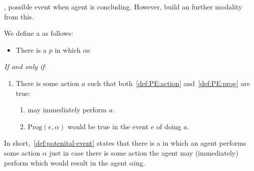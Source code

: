 \begin{note}
  \assuPP{}, possible event when agent is concluding.
  However, build an further modality from this.

  We define a \pevent{} as follows:
  \begin{definition}[\pevent{3}]
    \label{def:potenital-event}

    \begin{itemize}
    \item
      There is a \pevent{} \(p\) in which \vAgent{} \(\alpha\)s
    \end{itemize}

    \emph{If and only if}:

    \begin{enumerate}[label=]
    \item
      There is some action \(a\) such that both~\ref{def:PE:action} and~\ref{def:PE:prog} are true:
      \begin{enumerate}[label=\alph*., ref=(\alph*)]
      \item
        \label{def:PE:action}
        \vAgent{} may immediately perform \(a\).
      \item
        \label{def:PE:prog}
        \(\text{Prog}(e, \alpha)\) would be true in the event \(e\) of \vAgent{} doing \(a\).
      \end{enumerate}
    \end{enumerate}
    \vspace{-\baselineskip}
  \end{definition}

  In short,~\autoref{def:potenital-event} states that there is a \pevent{} in which an agent performs some action \(\alpha\) just in case there is some action the agent may (immediately) perform which would result in the agent \(\alpha\)ing.
\end{note}

